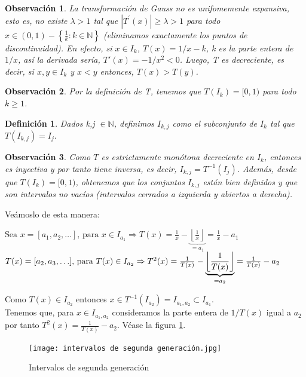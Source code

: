 \documentclass[12pt]{report}
\newtheorem{obs}{{Observación}}[section]
\newtheorem{defi}{Definición}[section]
\begin{document}
\begin{obs}
La transformación de Gauss no es unifomemente expansiva, esto es, no existe $\lambda>1$ tal que $|T^{\prime}(x)|\geq\lambda>1$ para todo $x \in(0,1) - \left\{\frac{1}{k} : k\in\mathbb{N}\right\}$ (eliminamos exactamente los puntos de discontinuidad). En efecto, si $x\in I_{k}$, $T(x)=1/x - k$, k es la parte entera de $1/x$, así la derivada sería, $T'(x)= -1/x^2 < 0$. Luego, T es decreciente, es decir, si $x,y \in I_{k}$ y $x<y$ entonces, $T(x)>T(y)$.
\end{obs} 

\begin{obs}
Por la definición de T, tenemos que $T(I_{k})=[0,1)$ para todo $k\geq1$.
\end{obs}
\begin{defi}
Dados k,j $\in\mathbb{N}$, definimos $I_{k,j}$ como el subconjunto de $I_{k}$ tal que
$
T(I_{k,j})=I_{j} .
$
\label{defi3-2}
\end{defi} 
\begin{obs}
Como $T$ es estrictamente monótona decreciente en $I_{k}$, entonces es inyectiva y por tanto tiene inversa, es decir, $I_{k,j}=T^{-1}(I_{j})$. Además, desde que $T(I_{k})=[0,1)$, obtenemos que los conjuntos $I_{k,j}$ están bien definidos y que son intervalos no vacíos (intervalos cerrados a izquierda y abiertos a derecha).
\end{obs}
Veámoslo de esta manera:


$
\text{Sea } x=[a_{1},a_{2},\ldots] \text{, para } x \in I_{a_{1}} \Rightarrow T(x)=\frac{1}{x}-\underbrace{\left\lfloor\frac{1}{x}\right\rfloor}_{=a_{1}}=\frac{1}{x}-a_{1}
$ \\

$
T(x)=[a_{2},a_{3},\ldots] \text{, para } T(x) \in I_{a_{2}}\Rightarrow T^{2}(x)=\frac{1}{T(x)}-\underbrace{\left\lfloor\frac{1}{T(x)}\right\rfloor}_{=a_{2}}=\frac{1}{T(x)}-a_{2} \\
$

Como $T(x) \in I_{a_{2}}$ entonces $x\in T^{-1}(I_{a_{2}})=I_{a_{1},a_{2}}\subset I_{a_{1}}$.
\\

Tenemos que, para $x\in I_{a_{1},a_{2}}$ consideramos la parte entera de $1/T(x)$ igual a $a_{2}$  por tanto $T^{2}(x)=\frac{1}{T(x)}-a_{2}$.
Véase la figura \ref{TG2}.

\begin{figure}[h]
    \centering
    \texttt{[image: intervalos de segunda generación.jpg]}
    \caption{Intervalos de segunda generación}
    \label{TG2}
\end{figure}
\end{document}
